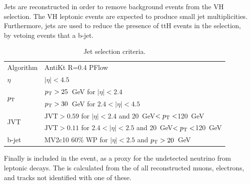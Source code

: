 Jets are reconstructed in order to remove background events from the VH selection.
The VH leptonic events are expected to produce small jet multiplicities.
Furthermore, jets are used to reduce the presence of ttH events in the selection, by vetoing events that a b-jet.

\begin{table}[H]
    \begin{center}
    \begin{tabular}{ll}
        \toprule
        Algorithm        &AntiKt R=0.4 PFlow\\
        $\eta$            &$|\eta| < 4.5$    \\
        \multirow{2}{*}{$p_\text{T}$}            &$p_\text{T} > 25$~GeV for $|\eta| < 2.4$\\
        &$p_\text{T} > 30$~GeV for $2.4 < |\eta| < 4.5$ \\
        \multirow{2}{*}{JVT}                & $\mathrm{JVT} > 0.59$ for $|\eta| < 2.4$ and 20~GeV$ < p_\text{T} < $120~GeV\\
        & $\mathrm{JVT} > 0.11$ for $2.4 < |\eta| < 2.5$ and 20~GeV$ < p_\text{T} < $120~GeV\\
        b-jet                & MV2c10 60\% WP for $|\eta| < 2.5$ and $p_\text{T} > 20$~GeV\\
        \bottomrule
    \end{tabular}
    \caption{Jet selection criteria.}
    \label{tab:hmmJetObjSel}
    \end{center}
\end{table}

Finally \met is included in the event, as a proxy for the undetected neutrino from leptonic \W decays.
The \met is calculated from the \pt of all reconstructed muons, electrons, and tracks not identified with one of these.

